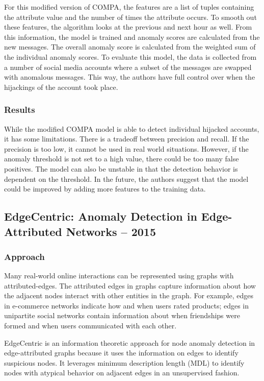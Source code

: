 \documentclass[11pt, oneside]{article}   	%
\begin{document}
\quad For this modified version of COMPA, the features are a list of tuples containing the attribute value and the number of times the attribute occurs.
To smooth out these features, the algorithm looks at the previous and next hour as well.
From this information, the model is trained and anomaly scores are calculated from the new messages.
The overall anomaly score is calculated from the weighted sum of the individual anomaly scores.
To evaluate this model, the data is collected from a number of social media accounts where a subset of the messages are swapped with anomalous messages.
This way, the authors have full control over when the hijackings of the account took place.

\subsubsection*{Results}

\quad While the modified COMPA model is able to detect individual hijacked accounts, it has some limitations.
There is a tradeoff between precision and recall.
If the precision is too low, it cannot be used in real world situations.
However, if the anomaly threshold is not set to a high value, there could be too many false positives.
The model can also be unstable in that the detection behavior is dependent on the threshold.
In the future, the authors suggest that the model could be improved by adding more features to the training data.

\subsection*{EdgeCentric: Anomaly Detection in Edge-Attributed Networks -- 2015}

\subsubsection*{Approach}

\quad Many real-world online interactions can be represented using graphs with attributed-edges.
The attributed edges in graphs capture information about how the adjacent nodes interact with other entities in the graph.
For example, edges in e-commerce networks indicate how and when users rated products; edges in unipartite social networks contain information about when friendships were formed and when users communicated with each other.

\quad EdgeCentric is an information theoretic approach for node anomaly detection in edge-attributed graphs because it uses the information on edges to identify suspicious nodes.
It leverages minimum description length (MDL) to identify nodes with atypical behavior on adjacent edges in an unsupervised fashion. 
\end{document}
